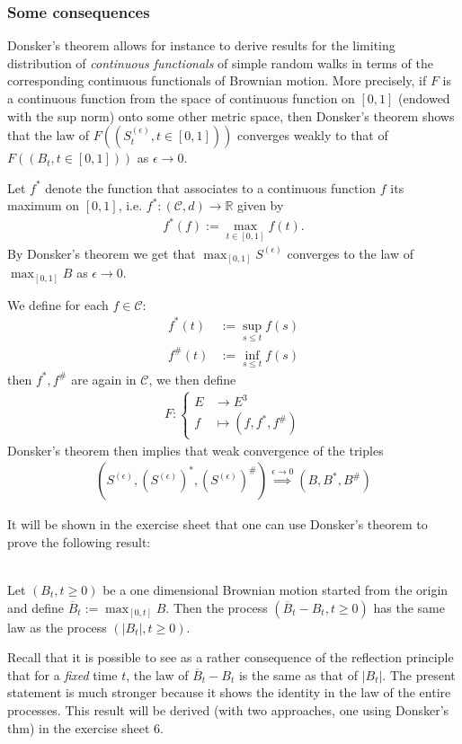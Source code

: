 \documentclass[../mainfile.tex]{subfiles}
\begin{document}
\subsubsection{Some consequences}
Donsker's theorem allows for instance to derive results for the limiting distribution of \textit{continuous functionals} of simple random walks in terms of the corresponding continuous functionals of Brownian motion. More precisely, if $F$ is a continuous function from the space of continuous function on $[0,1]$ (endowed with the sup norm) onto some other metric space, then Donsker's theorem shows that the law of $F((S_t^{( \epsilon)}, t \in [0,1]))$ converges weakly to that of $F((B_t,t \in [0,1]))$ as $\epsilon \to 0$. 
\begin{exmp}Let $f^*$ denote the function that associates to a continuous function $f$ its maximum on $[0,1]$, i.e. $f^* : (\mathcal{C},d) \to \mathbb{R}$ given by
\begin{align*}
f^*(f):= \max_{t \in [0,1]} f(t).
\end{align*}
By Donsker's theorem we get that $\max_{[0,1]} S^{( \epsilon)}$ converges to the law of $\max_{[0,1]} B$ as $\epsilon \to 0$. 
\end{exmp}
\begin{exmp} We define for each $f \in \mathcal{C}$: \begin{align*}
f^*(t)&:= \sup_{s \leq t} f(s) \\
f^\#(t)&:= \inf_{s \leq t} f(s)
\end{align*}
then $f^*,f^\#$ are again in $\mathcal{C}$, we then define 
\begin{align*}
F: \begin{cases} E & \longrightarrow E^3 \\
f & \longmapsto (f,f^*,f^\#) \end{cases}
\end{align*}
Donsker's theorem then implies that weak convergence of the triples
\begin{align*}
(S^{( \epsilon)}, (S^{( \epsilon)})^*, (S^{( \epsilon)})^\#) \overset{\epsilon \to 0}\implies (B,B^*,B^\#)
\end{align*}
\end{exmp}
It will be shown in the exercise sheet that one can use Donsker's theorem to prove the following result:
\begin{prop} \ \\ Let $(B_t, t \geq 0)$ be a one dimensional Brownian motion started from the origin and define $\overline{B}_t := \max_{[0,t]} B$. Then the process $(\overline{B}_t-B_t, t \geq 0)$ has the same law as the process $( |B_t|, t \geq 0)$. 
\end{prop}
\begin{rem} Recall that it is possible to see as a rather consequence of the reflection principle that for a \textit{fixed} time $t$, the law of $\overline{B}_t-B_t$ is the same as that of $|B_t|$. The present statement is much stronger because it shows the identity in the law of the entire processes. This result will be derived (with two approaches, one using Donsker's thm) in the exercise sheet 6.
\end{rem}
\newpage
\end{document}
